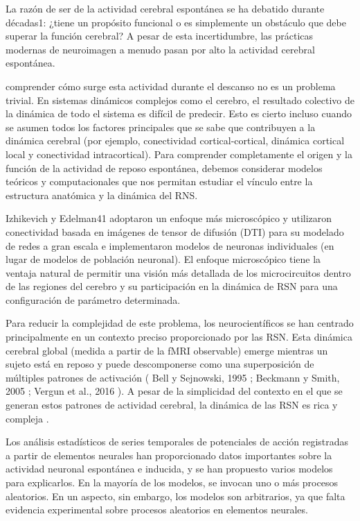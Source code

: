 La razón de ser de la actividad cerebral espontánea se ha debatido durante décadas1: ¿tiene un propósito funcional o es simplemente un obstáculo que debe superar la función cerebral? A pesar de esta incertidumbre, las prácticas modernas de neuroimagen a menudo pasan por alto la actividad cerebral espontánea.


comprender cómo surge esta actividad durante el descanso no es un problema trivial. En sistemas dinámicos complejos como el cerebro, el resultado colectivo de la dinámica de todo el sistema es difícil de predecir. Esto es cierto incluso cuando se asumen todos los factores principales que se sabe que contribuyen a la dinámica cerebral (por ejemplo, conectividad cortical-cortical, dinámica cortical local y conectividad intracortical).
Para comprender completamente el origen y la función de la actividad de reposo espontánea, debemos considerar modelos teóricos y computacionales que nos permitan estudiar el vínculo entre la estructura anatómica y la dinámica del RNS.

Izhikevich y Edelman41 adoptaron un enfoque más microscópico y utilizaron conectividad basada en imágenes de tensor de difusión (DTI) para su modelado de redes a gran escala e implementaron modelos de neuronas individuales (en lugar de modelos de población neuronal). El enfoque microscópico tiene la ventaja natural de permitir una visión más detallada de los microcircuitos dentro de las regiones del cerebro y su participación en la dinámica de RSN para una configuración de parámetro determinada.


Para reducir la complejidad de este problema, los neurocientíficos se han centrado principalmente en un contexto preciso proporcionado por las RSN. Esta dinámica cerebral global (medida a partir de la fMRI observable) emerge mientras un sujeto está en reposo y puede descomponerse como una superposición de múltiples patrones de activación ( Bell y Sejnowski, 1995 ; Beckmann y Smith, 2005 ; Vergun et al., 2016 ). A pesar de la simplicidad del contexto en el que se generan estos patrones de actividad cerebral, la dinámica de las RSN es rica y compleja \cite{beim_graben_metastable_2019}.  


Los análisis estadísticos de series temporales de potenciales de acción registradas a partir de elementos neurales han proporcionado datos importantes sobre la actividad neuronal espontánea e inducida, y se han propuesto varios modelos para explicarlos. En la mayoría de los modelos, se invocan uno o más procesos aleatorios. En un aspecto, sin embargo, los modelos son arbitrarios, ya que falta evidencia experimental sobre procesos aleatorios en elementos neurales.



